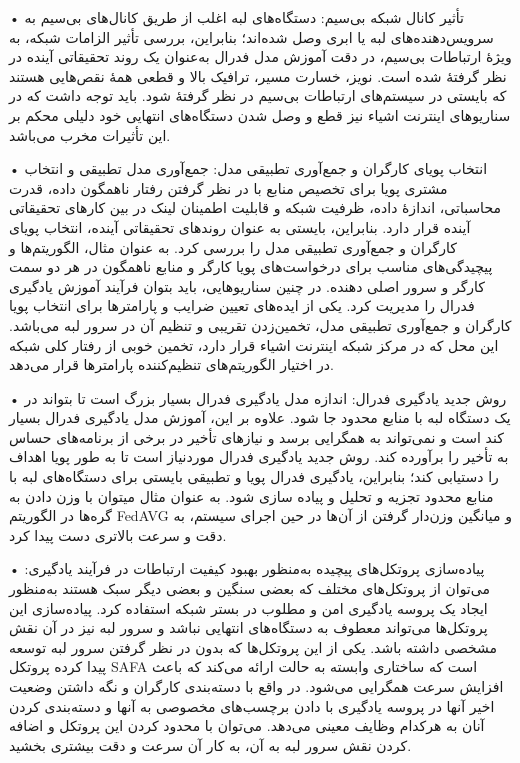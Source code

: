 • تأثیر کانال شبکه بى‌سیم: دستگاه‌های لبه اغلب از طریق کانال‌های بی‌سیم به سرویس‌دهنده‌های لبه یا ابرى وصل شده‌اند؛ بنابراین، بررسى تأثیر الزامات شبکه، به ویژۀ ارتباطات بی‌سیم، در دقت آموزش مدل فدرال به‌عنوان یک روند تحقیقاتى آینده در نظر گرفتۀ شده است. نویز، خسارت مسیر، ترافیک بالا و قطعی همۀ نقص‌هایی هستند که بایستى در سیستم‌های ارتباطات بی‌سیم در نظر گرفتۀ شود. باید توجه داشت که در سناریو‌های اینترنت اشیاء نیز قطع و وصل شدن دستگاه‌های انتهایی خود دلیلی محکم بر این تأثیرات مخرب می‌باشد.

• انتخاب پویای کارگران و جمع‌آوری تطبیقى مدل: جمع‌آوری مدل تطبیقى و انتخاب مشترى پویا برای تخصیص منابع با در نظر گرفتن رفتار ناهمگون داده، قدرت محاسباتى، اندازۀ داده، ظرفیت شبکه و قابلیت اطمینان لینک در بین کارهای تحقیقاتى آینده قرار دارد. بنابراین، بایستى به‌ عنوان روندهای تحقیقاتی آینده، انتخاب پویای کارگران و جمع‌آوری تطبیقى مدل را بررسى کرد. به ‌عنوان ‌مثال، الگوریتم‌ها و پیچیدگی‌های مناسب برای درخواست‌های پویا کارگر و منابع ناهمگون در هر دو سمت کارگر و سرور اصلی دهنده. در چنین سناریوهایی، باید بتوان فرآیند آموزش یادگیری فدرال را مدیریت کرد. یکی از ایده‌های تعیین ضرایب و پارامتر‌ها برای انتخاب پویا کارگران و جمع‌آوری تطبیقى مدل، تخمین‌زدن تقریبی و تنظیم آن در سرور لبه می‌باشد. این محل که در مرکز شبکه اینترنت اشیاء قرار دارد، تخمین خوبی از رفتار کلی شبکه در اختیار الگوریتم‌های تنظیم‌کننده پارامتر‌ها قرار می‌دهد\cite{a13}.

• روش جدید یادگیری فدرال: اندازه مدل یادگیری فدرال بسیار بزرگ است تا بتواند در یک دستگاه لبه با منابع محدود جا شود. علاوه بر این، آموزش مدل یادگیری فدرال بسیار کند است و نمی‌تواند به همگرایى برسد و نیازهای تأخیر در برخى از برنامه‌های حساس به تأخیر را برآورده کند. روش جدید یادگیری فدرال موردنیاز است تا به طور پویا اهداف را دستیابی کند؛ بنابراین، یادگیرى فدرال پویا و تطبیقى بایستى برای دستگاه‌های لبه با منابع محدود تجزیه و تحلیل و پیاده سازى شود. به عنوان مثال میتوان با وزن دادن به گره‌ها در الگوریتم FedAVG و میانگین وزن‌دار گرفتن از آن‌ها در حین اجرای سیستم، به دقت و سرعت بالاتری دست پیدا کرد.

• پیاده‌سازی پروتکل‌های پیچیده به‌منظور بهبود کیفیت ارتباطات در فرآیند یادگیری: می‌توان از پروتکل‌های مختلف که بعضی سنگین و بعضی دیگر سبک هستند به‌منظور ایجاد یک پروسه یادگیری امن و مطلوب در بستر شبکه استفاده کرد. پیاده‌سازی این پروتکل‌ها می‌تواند معطوف به دستگاه‌های انتهایی نباشد و سرور لبه نیز در آن نقش مشخصی داشته باشد. یکی از این پروتکل‌ها که بدون در نظر گرفتن سرور لبه توسعه پیدا کرده پروتکل SAFA است که ساختاری وابسته به حالت ارائه می‌کند که باعث افزایش سرعت همگرایی می‌شود. در واقع با دسته‌بندی کارگران و نگه داشتن وضعیت اخیر آنها در پروسه یادگیری با دادن برچسب‌های مخصوصی به آنها و دسته‌بندی کردن آنان به هرکدام وظایف معینی می‌دهد. می‌توان با محدود کردن این پروتکل و اضافه کردن نقش سرور لبه به آن، به کار آن سرعت و دقت بیشتری بخشید\cite{SAFA}.

